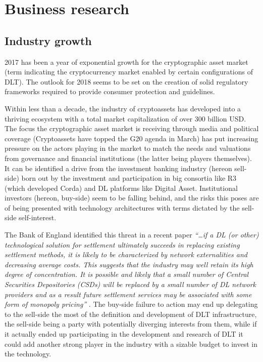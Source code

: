 \chapter{Business research}
\label{chap:business-analysis}

\section{Industry growth}

2017 has been a year of exponential growth for the cryptographic asset market (term indicating the cryptocurrency market enabled by certain configurations of DLT). The outlook for 2018 seems to be set on the creation of solid regulatory frameworks required to provide consumer protection and guidelines.

Within less than a decade, the industry of cryptoassets has developed into a thriving ecosystem with a total market capitalization of over 300 billion USD.
The focus the cryptographic asset market is receiving through media and political coverage (Cryptoassets have topped the G20 agenda in March) has put increasing pressure on the actors playing in the market to match the needs and valuations from governance and financial institutions (the latter being players themselves).\\

It can be identified a drive from the investment banking industry (hereon sell-side) born out by the investment and participation in big consortia like R3 (which developed Corda) and DL platforms like Digital Asset. Institutional investors (hereon, buy-side) seem to be falling behind, and the risks this poses are of being presented with technology architectures with terms dictated by the sell-side self-interest.

The Bank of England identified this threat in a recent paper \textit{“…if a DL (or other) technological solution for settlement ultimately succeeds in replacing existing settlement methods,
it is likely to be characterized by network externalities and decreasing average costs. This suggests that the industry may well retain its high degree of concentration. It is possible and likely that a small number of Central Securities Depositories (CSDs) will be replaced by a small number of DL network providers and as a result future settlement services may be associated with some form of monopoly pricing”} \cite{bankofenglandreport}. The buy-side failure to action may end up delegating to the sell-side the most of the definition and development of DLT infrastructure, the sell-side being a party with potentially diverging interests from them, while if it actually ended up participating in the development and research of DLT it could add another strong player in the industry with a sizable budget to invest in the technology.


